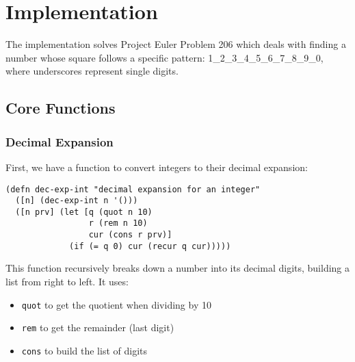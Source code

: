 \section{Implementation}

The implementation solves Project Euler Problem 206 which deals with finding a number whose square follows a specific pattern: 1_2_3_4_5_6_7_8_9_0, where underscores represent single digits.

\subsection{Core Functions}

\subsubsection{Decimal Expansion}
First, we have a function to convert integers to their decimal expansion:

\begin{lstlisting}
(defn dec-exp-int "decimal expansion for an integer"
  ([n] (dec-exp-int n '()))
  ([n prv] (let [q (quot n 10) 
                 r (rem n 10)
                 cur (cons r prv)]
             (if (= q 0) cur (recur q cur)))))
\end{lstlisting}

This function recursively breaks down a number into its decimal digits, building a list from right to left. It uses:
\begin{itemize}
    \item \texttt{quot} to get the quotient when dividing by 10
    \item \texttt{rem} to get the remainder (last digit)
    \item \texttt{cons} to build the list of digits
\end{itemize}
